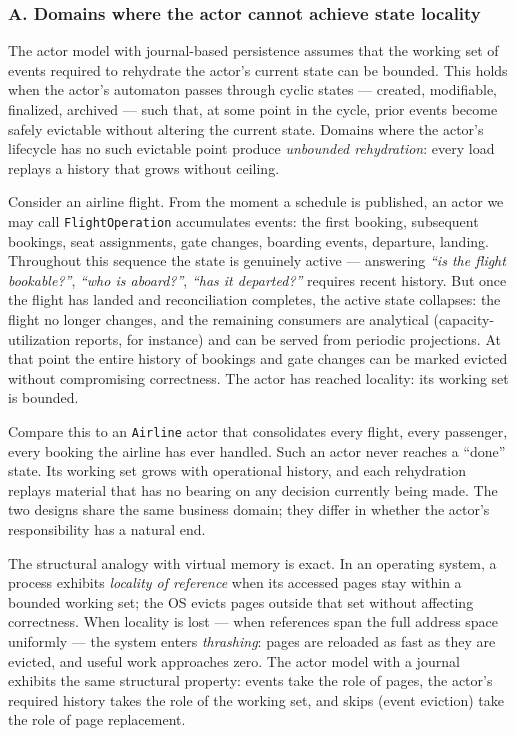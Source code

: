 \documentclass[
]{article}
\let\origtexttt\texttt%
\renewcommand{\texttt}[1]{\origtexttt{\seqsplit{#1}}}%
\let\texttt\origtexttt%
\begin{document}
\subsubsection{A. Domains where the actor cannot achieve state
locality}\label{a.-domains-where-the-actor-cannot-achieve-state-locality}

The actor model with journal-based persistence assumes that the working
set of events required to rehydrate the actor's current state can be
bounded. This holds when the actor's automaton passes through cyclic
states --- created, modifiable, finalized, archived --- such that, at
some point in the cycle, prior events become safely evictable without
altering the current state. Domains where the actor's lifecycle has no
such evictable point produce \emph{unbounded rehydration}: every load
replays a history that grows without ceiling.

Consider an airline flight. From the moment a schedule is published, an
actor we may call \texttt{FlightOperation} accumulates events: the first
booking, subsequent bookings, seat assignments, gate changes, boarding
events, departure, landing. Throughout this sequence the state is
genuinely active --- answering \emph{``is the flight bookable?''},
\emph{``who is aboard?''}, \emph{``has it departed?''} requires recent
history. But once the flight has landed and reconciliation completes,
the active state collapses: the flight no longer changes, and the
remaining consumers are analytical (capacity-utilization reports, for
instance) and can be served from periodic projections. At that point the
entire history of bookings and gate changes can be marked evicted
without compromising correctness. The actor has reached locality: its
working set is bounded.

Compare this to an \texttt{Airline} actor that consolidates every
flight, every passenger, every booking the airline has ever handled.
Such an actor never reaches a ``done'' state. Its working set grows with
operational history, and each rehydration replays material that has no
bearing on any decision currently being made. The two designs share the
same business domain; they differ in whether the actor's responsibility
has a natural end.

The structural analogy with virtual memory is exact. In an operating
system, a process exhibits \emph{locality of reference} when its
accessed pages stay within a bounded working set; the OS evicts pages
outside that set without affecting correctness. When locality is lost
--- when references span the full address space uniformly --- the system
enters \emph{thrashing}: pages are reloaded as fast as they are evicted,
and useful work approaches zero. The actor model with a journal exhibits
the same structural property: events take the role of pages, the actor's
required history takes the role of the working set, and skips (event
eviction) take the role of page replacement.
\end{document}
